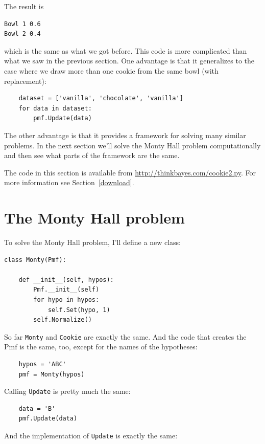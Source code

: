 \documentclass[12pt]{book}
\begin{document}
The result is

\begin{verbatim}
Bowl 1 0.6
Bowl 2 0.4
\end{verbatim}

which is the same as what we got before.  This code is more complicated
than what we saw in the previous section.  One advantage is that it
generalizes to the case where we draw more than one cookie from the
same bowl (with replacement):

\begin{verbatim}
    dataset = ['vanilla', 'chocolate', 'vanilla']
    for data in dataset:
        pmf.Update(data)
\end{verbatim}

The other advantage is that it provides a framework for solving many
similar problems.  In the next section we'll solve the Monty Hall
problem computationally and then see what parts of the framework are
the same.

The code in this section is available from
\url{http://thinkbayes.com/cookie2.py}.
  For more information
see Section~\ref{download}.

\section{The Monty Hall problem}

To solve the Monty Hall problem, I'll define a new class:

\begin{verbatim}
class Monty(Pmf):

    def __init__(self, hypos):
        Pmf.__init__(self)
        for hypo in hypos:
            self.Set(hypo, 1)
        self.Normalize()
\end{verbatim}

So far \verb"Monty" and \verb"Cookie" are exactly the same.
And the code that creates the Pmf is the same, too, except for
the names of the hypotheses:

\begin{verbatim}
    hypos = 'ABC'
    pmf = Monty(hypos)
\end{verbatim}

Calling \verb"Update" is pretty much the same:

\begin{verbatim}
    data = 'B'
    pmf.Update(data)
\end{verbatim}

And the implementation of \verb"Update" is exactly the same:
\end{document}
